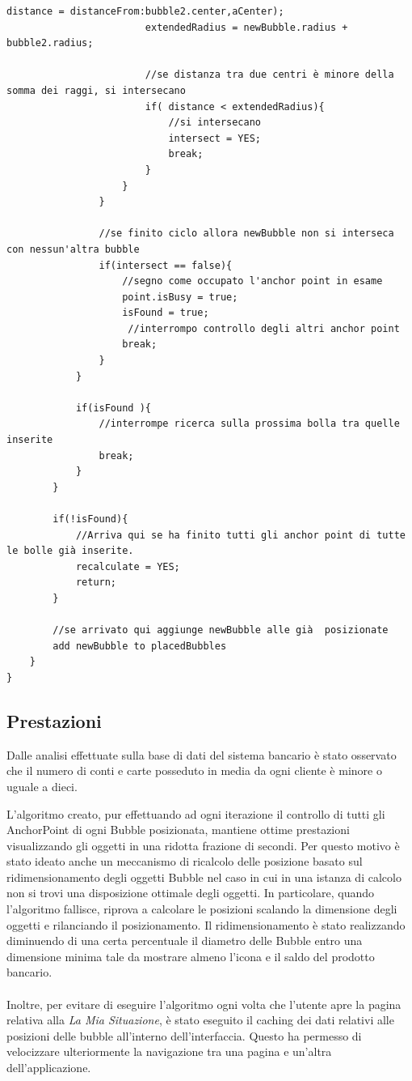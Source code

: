 \begin{lstlisting}[label=algo:3,caption=calculateOriginForBubbles,breaklines=true,  commentstyle=\color{CadetBlue}]
                        distance = distanceFrom:bubble2.center,aCenter);
                        extendedRadius = newBubble.radius + bubble2.radius;

                        //se distanza tra due centri è minore della somma dei raggi, si intersecano
                        if( distance < extendedRadius){
                            //si intersecano
                            intersect = YES;
                            break;
                        }
                    }
                }
                
                //se finito ciclo allora newBubble non si interseca con nessun'altra bubble
                if(intersect == false){
                    //segno come occupato l'anchor point in esame
                    point.isBusy = true;
                    isFound = true;
                     //interrompo controllo degli altri anchor point
                    break;
                }
            }

            if(isFound ){
                //interrompe ricerca sulla prossima bolla tra quelle inserite
                break;
            }
        }

        if(!isFound){
            //Arriva qui se ha finito tutti gli anchor point di tutte le bolle già inserite.
            recalculate = YES;
            return;
        }

        //se arrivato qui aggiunge newBubble alle già  posizionate
        add newBubble to placedBubbles
    }
}
\end{lstlisting}


\subsection{Prestazioni}
Dalle analisi effettuate sulla base di dati del sistema bancario è stato osservato che il numero di conti e carte posseduto in media da ogni cliente è minore o uguale a dieci.

L'algoritmo creato, pur effettuando ad ogni iterazione il controllo di tutti gli AnchorPoint di ogni Bubble posizionata, mantiene ottime prestazioni visualizzando gli oggetti in una ridotta frazione di secondi. Per questo motivo è stato ideato anche un meccanismo di ricalcolo delle posizione basato sul ridimensionamento degli oggetti Bubble nel caso in cui in una istanza di calcolo non si trovi una disposizione ottimale degli oggetti.  
In particolare, quando l'algoritmo fallisce, riprova a calcolare le posizioni scalando la dimensione degli oggetti e rilanciando il posizionamento. Il ridimensionamento è stato realizzando diminuendo di una certa percentuale il diametro delle Bubble entro una dimensione minima tale da mostrare almeno l'icona e il saldo del prodotto bancario.
\\\\
Inoltre, per evitare di eseguire l'algoritmo ogni volta che l'utente apre la pagina relativa alla \emph{La Mia Situazione}, è stato eseguito il caching dei dati relativi alle posizioni delle bubble all'interno dell'interfaccia. Questo ha permesso di velocizzare ulteriormente la navigazione tra una pagina e un'altra dell'applicazione.
